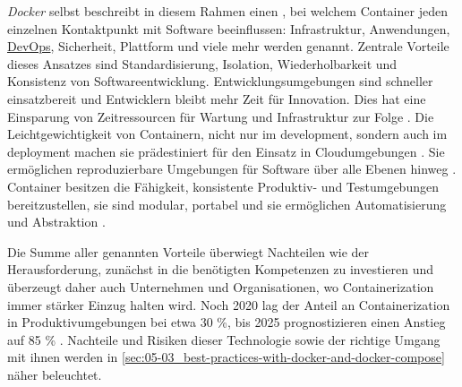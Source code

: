 \textit{Docker} selbst beschreibt in diesem Rahmen einen , bei welchem Container jeden einzelnen Kontaktpunkt mit Software beeinflussen: Infrastruktur, Anwendungen, \hyperref[sec:03-01_devops]{DevOps}, Sicherheit, Plattform und viele mehr werden genannt. Zentrale Vorteile dieses Ansatzes sind Standardisierung, Isolation, Wiederholbarkeit und Konsistenz von Softwareentwicklung. Entwicklungsumgebungen sind schneller einsatzbereit und Entwicklern bleibt mehr Zeit für Innovation. Dies hat eine Einsparung von Zeitressourcen für Wartung und Infrastruktur zur Folge \cite{016:Effectively-managing-all-of-those-Applications}. Die Leichtgewichtigkeit von Containern, nicht nur im \Gls{development}, sondern auch im \Gls{deployment} machen sie prädestiniert für den Einsatz in Cloudumgebungen \cite{015:Containers-in-Software-Development,024:Investiugating-Impact-of-Containerization-on-Deployment-Process-in-DevOps,025:Exploring-Solutions-for-Container-Image-Security}. Sie ermöglichen reproduzierbare Umgebungen für Software über alle Ebenen hinweg \cite{013:Role-of-Containers-in-Reproducibility,024:Investiugating-Impact-of-Containerization-on-Deployment-Process-in-DevOps}. Container besitzen die Fähigkeit, konsistente Produktiv- und Testumgebungen bereitzustellen, sie sind modular, portabel und sie ermöglichen Automatisierung und Abstraktion \cite{014:Managing-Container-based-Software-Development-Environments}.

Die Summe aller genannten Vorteile überwiegt Nachteilen wie der Herausforderung, zunächst in die benötigten Kompetenzen zu investieren und überzeugt daher auch Unternehmen und Organisationen, wo Containerization immer stärker Einzug halten wird. Noch 2020 lag der Anteil an Containerization in Produktivumgebungen bei etwa 30 \%, bis 2025 prognostizieren \citeauthor{020:Assessing-and-Improving-Quality-of-Docker-Artifacts} einen Anstieg auf 85 \% \cite{020:Assessing-and-Improving-Quality-of-Docker-Artifacts}. Nachteile und Risiken dieser Technologie sowie der richtige Umgang mit ihnen werden in \autoref{sec:05-03_best-practices-with-docker-and-docker-compose} näher beleuchtet.

